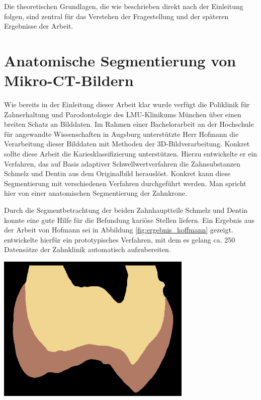 Die theoretischen Grundlagen, die wie beschrieben direkt nach der Einleitung
folgen, sind zentral für das Verstehen der Fragestellung und der späteren Ergebnisse
der Arbeit.

\section{Anatomische Segmentierung von Mikro-CT-Bildern}
\label{sec:verwwandte_arbeit} Wie bereits in der Einleitung dieser Arbeit klar wurde
verfügt die Poliklinik für Zahnerhaltung und Parodontologie des \ac{LMU}-Klinikums
München über einen breiten Schatz an Bilddaten. Im Rahmen einer Bachelorarbeit an
der Hochschule für angewandte Wissenschaften in Augsburg unterstützte Herr Hofmann
die Verarbeitung dieser Bilddaten mit Methoden der 3D-Bildverarbeitung. Konkret
sollte diese Arbeit die Kariesklassifizierung unterstützen. Hierzu entwickelte er
ein Verfahren, das auf Basis adaptiver Schwellwertverfahren die Zahnsubstanzen
Schmelz und Dentin aus dem Originalbild herauslöst. Konkret kann diese Segmentierung
mit verschiedenen Verfahren durchgeführt werden. Man spricht hier von einer
anatomischen Segmentierung der Zahnkrone.

\begin{minipage}{0.40\textwidth}
	Durch die Segmentbetrachtung der beiden Zahnhauptteile Schmelz und Dentin konnte
	\citet[S.~41]{hoffmann2020} eine gute Hilfe für die Befundung kariöse Stellen
	liefern. Ein Ergebnis aus der Arbeit von Hofmann sei in Abbildung \ref{fig:ergebnis_hoffmann}
	gezeigt. \citet[S.~53]{hoffmann2020} entwickelte hierfür ein prototypisches Verfahren,
	mit dem es gelang ca. 250 Datensätze der Zahnklinik automatisch aufzubereiten.
\end{minipage}
\hfill
\begin{minipage}{0.50\textwidth}
	\centering
	\includegraphics[width=0.7\textwidth]{img/ergebnis_hoffmann_2.jpg}
	\label{fig:ergebnis_hoffmann}
\end{minipage}

